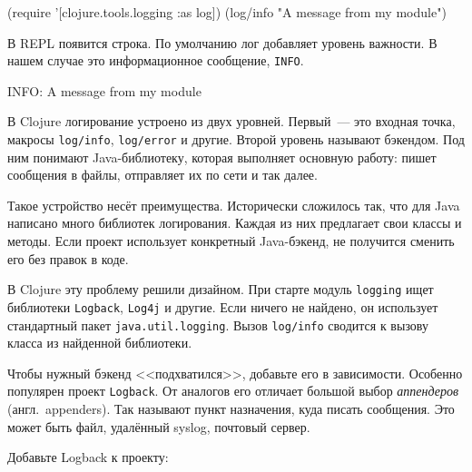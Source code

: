 \else

\begin{english}
  \begin{clojure}
(require '[clojure.tools.logging :as log])
(log/info "A message from my module")
  \end{clojure}
\end{english}

\fi

\noindent
В REPL появится строка. По умолчанию лог добавляет уровень важности. В нашем
случае это информационное сообщение, \verb|INFO|.

\begin{english}
  \begin{text}
INFO: A message from my module
  \end{text}
\end{english}

В Clojure логирование устроено из двух уровней. Первый~--- это входная точка,
макросы \verb|log/info|, \verb|log/error| и другие. Второй уровень называют
бэкендом. Под ним понимают Java-библиотеку, которая выполняет основную работу:
пишет сообщения в файлы, отправляет их по сети и так далее.

Такое устройство несёт преимущества. Исторически сложилось так, что для Java
написано много библиотек логирования. Каждая из них предлагает свои классы и
методы. Если проект использует конкретный Java-бэкенд, не получится сменить его
без правок в коде.


В Clojure эту проблему решили дизайном. При старте модуль \verb|logging| ищет
библиотеки \verb|Logback|, \verb|Log4j| и другие. Если ничего не найдено, он
использует стандартный пакет \verb|java.util.logging|. Вызов \verb|log/info|
сводится к вызову класса из найденной библиотеки.

Чтобы нужный бэкенд <<подхватился>>, добавьте его в зависимости. Особенно
популярен проект \verb|Logback|. От аналогов его отличает большой выбор
\emph{аппендеров} (англ.~appenders). Так называют пункт назначения, куда писать
сообщения. Это может быть файл, удалённый syslog, почтовый сервер.

Добавьте Logback к проекту:

\begin{english}
  \begin{clojure}
  \end{clojure}
\end{english}

